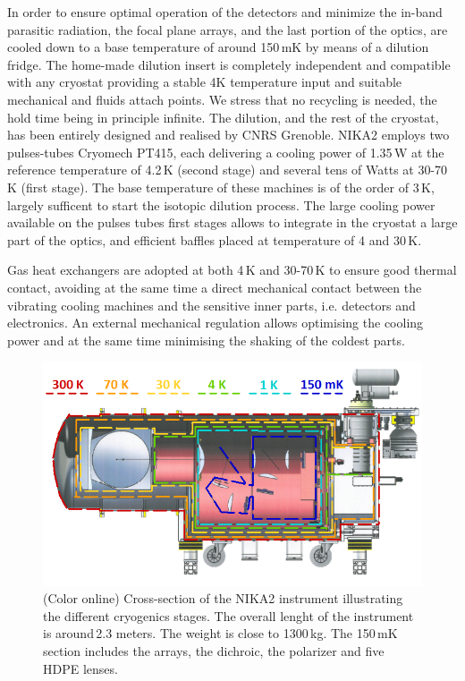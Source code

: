 \documentclass[]{aa} %
\begin{document}
In order to ensure optimal operation of the detectors and minimize the in-band parasitic radiation, the focal plane arrays, and the last portion of the optics, are cooled down to a base temperature of around 150\,mK by means of a dilution fridge. The home-made dilution insert is completely independent and compatible with any cryostat providing a stable 4K temperature input and suitable mechanical and fluids attach points. We stress that no recycling is needed, the hold time being in principle infinite. The dilution, and the rest of the cryostat, has been entirely designed and realised by CNRS Grenoble. NIKA2 employs two pulses-tubes Cryomech PT415, each delivering a cooling power of 1.35\,W at the reference temperature of 4.2\,K (second stage) and several tens of Watts at 30-70\,K (first stage). The base temperature of these machines is of the order of 3\,K, largely sufficent to start the isotopic dilution process. The large cooling power available on the pulses tubes first stages allows to integrate in the cryostat a large part of the optics, and efficient baffles placed at temperature of  4 and 30\,K. 

Gas heat exchangers are adopted at both 4\,K and 30-70\,K to ensure good thermal contact, avoiding at the same time a direct mechanical contact between the vibrating cooling machines and the sensitive inner parts, i.e. detectors and electronics. An external mechanical regulation allows optimising the cooling power and at the same time minimising the shaking of the coldest parts. 

\begin{figure}[h]
   \centering
   \includegraphics[width=.95\linewidth]{NIKA2_cryoStages.png}
      \caption{(Color online) Cross-section of the NIKA2 instrument illustrating the different cryogenics stages. The overall lenght of the instrument is around\,2.3 meters. The weight is close to 1300\,kg. The 150\,mK section includes the arrays, the dichroic, the polarizer and five HDPE lenses.}
         \label{Cryostat_cryo}
\end{figure}
\end{document}
